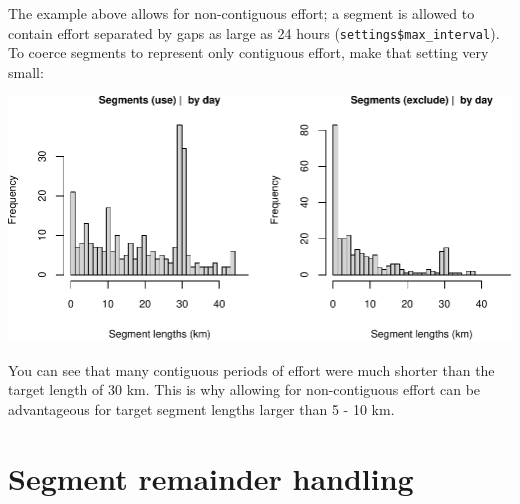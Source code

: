 \documentclass[
]{book}
\newenvironment{Shaded}{\begin{snugshade}}{\end{snugshade}}
\newcommand{\CommentTok}[1]{\textcolor[rgb]{0.56,0.35,0.01}{\textit{#1}}}
\newcommand{\DataTypeTok}[1]{\textcolor[rgb]{0.13,0.29,0.53}{#1}}
\newcommand{\DecValTok}[1]{\textcolor[rgb]{0.00,0.00,0.81}{#1}}
\newcommand{\FloatTok}[1]{\textcolor[rgb]{0.00,0.00,0.81}{#1}}
\newcommand{\KeywordTok}[1]{\textcolor[rgb]{0.13,0.29,0.53}{\textbf{#1}}}
\newcommand{\NormalTok}[1]{#1}
\newcommand{\OperatorTok}[1]{\textcolor[rgb]{0.81,0.36,0.00}{\textbf{#1}}}
\newcommand{\OtherTok}[1]{\textcolor[rgb]{0.56,0.35,0.01}{#1}}
\newcommand{\StringTok}[1]{\textcolor[rgb]{0.31,0.60,0.02}{#1}}
\begin{document}
The example above allows for non-contiguous effort; a segment is allowed to contain effort separated by gaps as large as 24 hours (\texttt{settings\$max\_interval}). To coerce segments to represent only contiguous effort, make that setting very small:

\begin{Shaded}
\end{Shaded}

\includegraphics{figures/unnamed-chunk-144-1.pdf}

You can see that many contiguous periods of effort were much shorter than the target length of 30 km. This is why allowing for non-contiguous effort can be advantageous for target segment lengths larger than 5 - 10 km.

\hypertarget{segment-remainder-handling}{%
\section*{Segment remainder handling}\label{segment-remainder-handling}}
\end{document}
